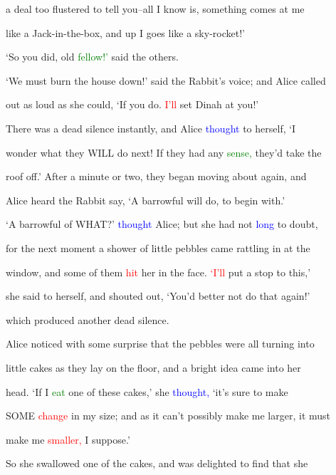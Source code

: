  a \textcolor{BurntOrange}{deal} too flustered to tell you--all I know is, something comes at me

 like a Jack-in-the-box, and up I goes like a sky-rocket!’



 ‘So you did, old \textcolor{green}{fellow!’} said the others.



 ‘We must burn the house down!’ said the Rabbit’s voice; and Alice called

 out as loud as she could, ‘If you do. \textcolor{red}{I’ll} set Dinah at you!’



 There was a dead silence instantly, and Alice \textcolor{blue}{thought} to herself, ‘I

 wonder what they WILL do next! If they had any \textcolor{green}{sense,} they’d take the

 roof off.’ After a minute or two, they began moving about again, and

 Alice heard the Rabbit say, ‘A barrowful will do, to begin with.’



 ‘A barrowful of WHAT?’ \textcolor{blue}{thought} Alice; but she had not \textcolor{blue}{long} to \textcolor{BurntOrange}{doubt,}

 for the next moment a shower of little pebbles came rattling in at the

 window, and some of them \textcolor{red}{hit} her in the face. \textcolor{red}{‘I’ll} put a stop to this,’

 she said to herself, and \textcolor{BurntOrange}{shouted} out, ‘You’d better not do that again!’

 which produced another dead silence.



 Alice noticed with some \textcolor{BurntOrange}{surprise} that the pebbles were all turning into

 little cakes as they lay on the floor, and a bright idea came into her

 head. ‘If I \textcolor{green}{eat} one of these cakes,’ she \textcolor{blue}{thought,} ‘it’s sure to make

 SOME \textcolor{red}{change} in my size; and as it can’t possibly make me larger, it must

 make me \textcolor{red}{smaller,} I suppose.’



 So she swallowed one of the cakes, and was \textcolor{BurntOrange}{delighted} to find that she

